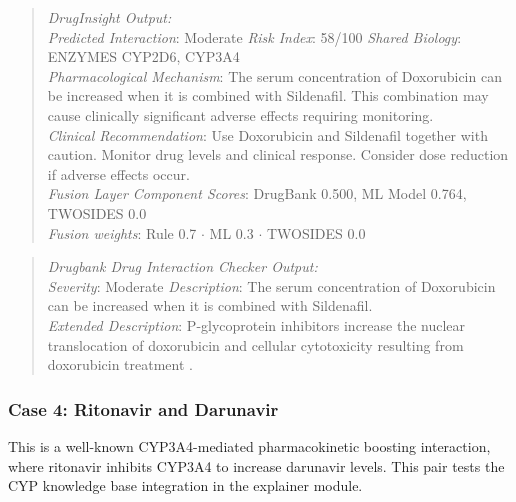 \documentclass[conference]{IEEEtran}
\begin{document}
\begin{quote}
\textit{DrugInsight Output:}\\
\textit{Predicted Interaction}: Moderate \newline\quad \textit{Risk Index}: 58/100\newline
\quad \textit{Shared Biology}: ENZYMES CYP2D6, CYP3A4\\ \newline
\textit{Pharmacological Mechanism}: The serum concentration of Doxorubicin can be increased when it is combined with Sildenafil. This combination may cause clinically significant adverse effects requiring monitoring. \\ \newline
\textit{Clinical Recommendation}: Use Doxorubicin and Sildenafil together with caution. Monitor drug levels and clinical response. Consider dose reduction if adverse effects occur.\\ \newline
\textit{Fusion Layer Component Scores}: DrugBank 0.500, ML Model 0.764, TWOSIDES 0.0\\ \newline
\textit{Fusion weights}: Rule 0.7 $\cdot$ ML 0.3 $\cdot$ TWOSIDES 0.0
\end{quote}

\begin{quote}
\textit{Drugbank Drug Interaction Checker Output:}\\
\quad \textit{Severity}: Moderate \cite{drugbankchecker}\newline
\quad \textit{Description}: The serum concentration of Doxorubicin can be increased when it is combined with Sildenafil.\\ \newline
\textit{Extended Description}: P-glycoprotein inhibitors increase the nuclear translocation of doxorubicin and cellular cytotoxicity resulting from doxorubicin treatment \cite{bao2011}. \\
\end{quote}

\subsubsection{\textbf{Case 4: Ritonavir and Darunavir}}
This is a well-known CYP3A4-mediated pharmacokinetic boosting interaction, where ritonavir inhibits CYP3A4 to increase darunavir levels. This pair tests the CYP knowledge base integration in the explainer module.
\end{document}
